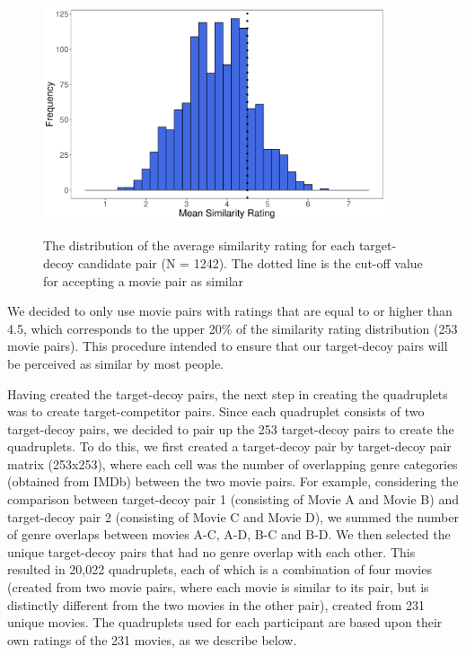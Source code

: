 \documentclass[12pt, a4paper]{article}
\begin{document}
\begin{figure}[htb!]
\centering
		\caption{The distribution of the average similarity rating for each target-decoy candidate pair (N = 1242). The dotted line is the cut-off value for accepting a movie pair as similar}
\includegraphics[width=0.9\textwidth]{figure2.pdf}
\label{fig:exp2_pilot}
\end{figure}

We decided to only use movie pairs with ratings that are equal to or higher than 4.5, which corresponds to the upper 20\% of the similarity rating distribution (253 movie pairs). This procedure intended to ensure that our target-decoy pairs will be perceived as similar by most people.

Having created the target-decoy pairs, the next step in creating the quadruplets was to create target-competitor pairs. Since each quadruplet consists of two target-decoy pairs, we decided to pair up the 253 target-decoy pairs to create the quadruplets. To do this, we first created a target-decoy pair by target-decoy pair matrix (253x253), where each cell was the number of overlapping genre categories (obtained from IMDb) between the two movie pairs. For example, considering the comparison between target-decoy pair 1 (consisting of Movie A and Movie B) and target-decoy pair 2 (consisting of Movie C and Movie D), we summed the number of genre overlaps between movies A-C, A-D, B-C and B-D. We then selected the unique target-decoy pairs that had no genre overlap with each other. This resulted in 20,022 quadruplets, each of which is a combination of four movies (created from two movie pairs, where each movie is similar to its pair, but is distinctly different from the two movies in the other pair), created from 231 unique movies. The quadruplets used for each participant are based upon their own ratings of the 231 movies, as we describe below.
\end{document}

